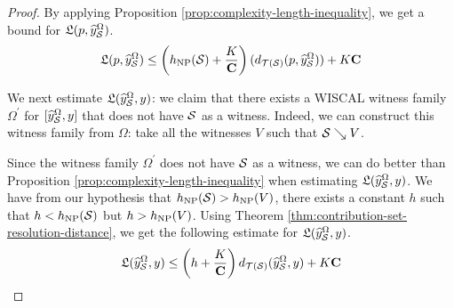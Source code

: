 \begin{proof}
By applying Proposition \ref{prop:complexity-length-inequality}, we get a bound for $\mathfrak{L}(p, \widehat{y}_{\mathcal{S}}^{\Omega})$.
\begin{align}
  \label{eq:eq2}
  \mathfrak{L}(p, \widehat{y}_{\mathcal{S}}^{\Omega}) \leq \left( h_{\mathrm{NP}}(\mathcal{S}) + \frac{K}{\mathbf{C}} \right) (d_{\mathcal{T}(\mathcal{S})}(p, \widehat{y}_{\mathcal{S}}^{\Omega})) + K \mathbf{C}
\end{align}

We next estimate $\mathfrak{L}(\widehat{y}_{\mathcal{S}}^{\Omega}, y)$: we claim that there exists a WISCAL witness family $\Omega^{\prime}$ for $[\widehat{y}_{\mathcal{S}}^{\Omega}, y]$ that does not have $\mathcal{S}$ as a witness.
Indeed, we can construct this witness family from $\Omega$: take all the witnesses $V$ such that $\mathcal{S} \searrow V$.

Since the witness family $\Omega^{\prime}$ does not have $\mathcal{S}$ as a witness, we can do better than Proposition \ref{prop:complexity-length-inequality} when estimating $\mathfrak{L}(\widehat{y}_{\mathcal{S}}^{\Omega}, y)$.
We have from our hypothesis that $h_{\mathrm{NP}}(\mathcal{S}) > h_{\mathrm{NP}}(V)$, there exists a constant $h$ such that $h < h_{\mathrm{NP}}(\mathcal{S})$ but $h > h_{\mathrm{NP}}(V)$.
Using Theorem \ref{thm:contribution-set-resolution-distance}, we get the following estimate for $\mathfrak{L}(\widehat{y}_{\mathcal{S}}^{\Omega}, y)$.
\begin{align}
  \label{eq:eq3p}
\mathfrak{L}(\widehat{y}_{\mathcal{S}}^{\Omega}, y) \leq \left( h + \frac{K}{\mathbf{C}} \right) d_{\mathcal{T}(\mathcal{S})}(\widehat{y}_{\mathcal{S}}^{\Omega}, y) + K \mathbf{C}
\end{align}


\end{proof}
